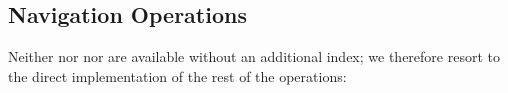 \begin{algorithm}
\begin{algorithmic}
	\State {}
\EndFunction
\end{algorithmic}
\end{algorithm}

\begin{algorithm}
\begin{algorithmic}
	\State {} 
\EndFunction
\end{algorithmic}
\end{algorithm}

\subsection{Navigation Operations}

\begin{algorithm}
\begin{algorithmic}
	\State {}
\EndFunction
\end{algorithmic}
\end{algorithm}

Neither \degree{} nor \childRank{} nor \childSelect{} are available without an additional index; we therefore resort to the direct implementation of the rest of the \childAny{} operations:

\begin{algorithm}
\begin{algorithmic}
	\State {}
\EndFunction
\end{algorithmic}
\end{algorithm}

\begin{algorithm}
\begin{algorithmic}
	\State {}
\EndFunction
\end{algorithmic}
\end{algorithm}

\begin{algorithm}
\begin{algorithmic}
	\State {}
\EndFunction
\end{algorithmic}
\end{algorithm}

